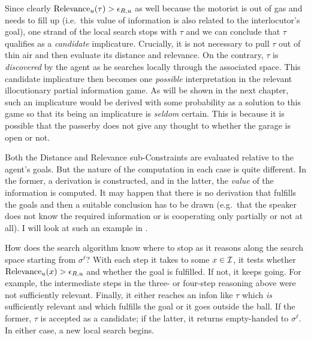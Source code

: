 Since clearly $\hbox{Relevance}_u(\tau) > \epsilon_{R,u}$ as well because the motorist is out of gas and needs to fill up (i.e.\ this value of information is also related to the interlocutor's goal), one strand of the local search stops with $\tau$ and we can conclude that $\tau$ qualifies as a \emph{candidate} implicature. Crucially, it is not necessary to pull $\tau$ out of thin air and then evaluate its distance and relevance. On the contrary, $\tau$ is \emph{discovered} by the agent as he searches locally through the associated space. This candidate implicature then becomes one \emph{possible} interpretation in the relevant illocutionary partial information game. As will be shown in the next chapter, such an implicature would be derived with some probability as a solution to this game so that its being an implicature is \emph{seldom} certain. This is because it is possible that the passerby does not give any thought to whether the garage is open or not.

Both the Distance and Relevance sub-Constraints are evaluated relative to the agent's goals. But the nature of the computation in each case is quite different. In the former, a derivation is constructed, and in the latter, the \emph{value} of the information is computed. It may happen that there is no derivation that fulfills the goals and then a suitable conclusion has to be drawn (e.g.\ that the speaker does not know the required information or is cooperating only partially or not at all). I will look at such an example in .

How does the search algorithm know where to stop as it reasons along the search space starting from $\sigma^\ell$? With each step it takes to some $x \in {\cal I}$, it tests whether $\hbox{Relevance}_u(x) > \epsilon_{R,u}$ and whether the goal is fulfilled. If not, it keeps going. For example, the intermediate steps in the three- or four-step reasoning above were not sufficiently relevant. Finally, it either reaches an infon like $\tau$ which \emph{is} sufficiently relevant and which fulfills the goal or it goes outside the ball. If the former, $\tau$ is accepted as a candidate; if the latter, it returns empty-handed to $\sigma^\ell$. In either case, a new local search begins.


